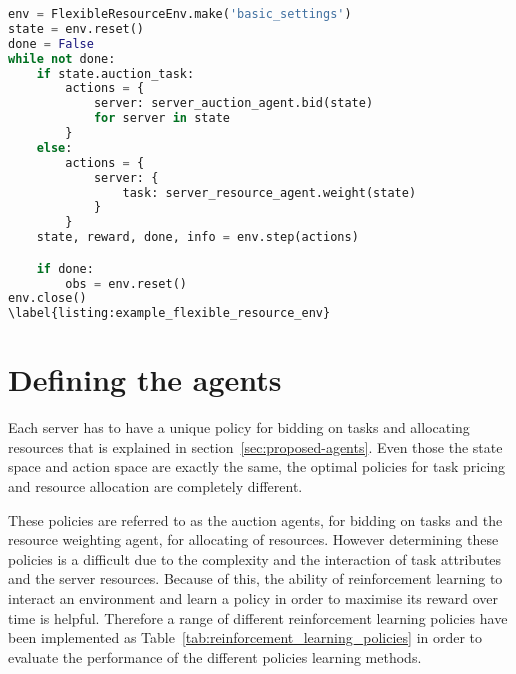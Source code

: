\begin{lstlisting}[language=Python, frame=single]
env = FlexibleResourceEnv.make('basic_settings')
state = env.reset()
done = False
while not done:
    if state.auction_task:
        actions = {
            server: server_auction_agent.bid(state)
            for server in state
        }
    else:
        actions = {
            server: {
                task: server_resource_agent.weight(state)
            }
        }
    state, reward, done, info = env.step(actions)

    if done:
        obs = env.reset()
env.close()
\label{listing:example_flexible_resource_env}
\end{lstlisting}

\section{Defining the agents}\label{sec:agent-definition}
Each server has to have a unique policy for bidding on tasks and allocating resources that is explained in
section~\ref{sec:proposed-agents}. Even those the state space and action space are exactly the same, the optimal
policies for task pricing and resource allocation are completely different.

These policies are referred to as the auction agents, for bidding on tasks and the resource weighting agent,
for allocating of resources. However determining these policies is a difficult due to the complexity and the interaction
of task attributes and the server resources. Because of this, the ability of reinforcement learning to interact
an environment and learn a policy in order to maximise its reward over time is helpful. Therefore a range of different
reinforcement learning policies have been implemented as Table~\ref{tab:reinforcement_learning_policies} in order to
evaluate the performance of the different policies learning methods.

